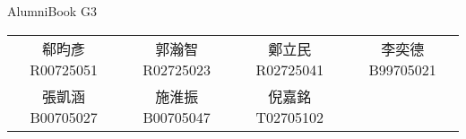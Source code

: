 \documentclass[11pt]{article}
\begin{document}
\begin{center}
{\Huge AlumniBook} {G3}
\end{center}
\begin{center}\begin{tabular}{cccc}
郗昀彥 R00725051&郭瀚智 R02725023&鄭立民 R02725041&李奕德 B99705021 \\
張凱涵 B00705027&施淮振 B00705047&倪嘉銘 T02705102&
\end{tabular}\end{center}
\end{document}
